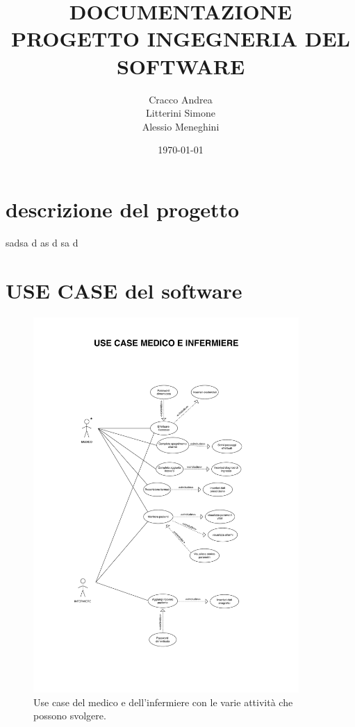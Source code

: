 \documentclass{article}
\begin{document}
\title{DOCUMENTAZIONE PROGETTO INGEGNERIA DEL SOFTWARE}

\author{Cracco Andrea\\Litterini Simone\\Alessio Meneghini }

\date{\today}

\maketitle

\vspace{1.5cm}

\newpage


\section{descrizione del progetto}

sadsa
d
as
d
sa
d


\section{USE CASE del software}

	\vspace{0.5cm}

	\begin{figure}[H]

		\includegraphics[width=0.9\textwidth]{documenti/useCase_infermiere.pdf}
		\caption{Use case del medico e dell'infermiere con le varie attività che possono svolgere.}
		\label{usecase_medico_infermiere}

	\end{figure}
\end{document}
